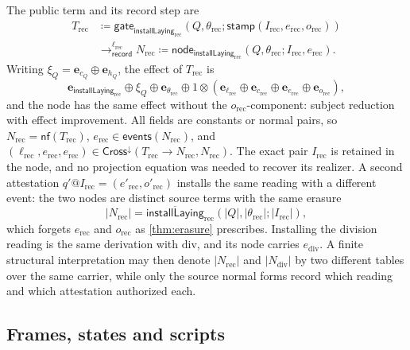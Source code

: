 \documentclass[11pt]{article}
\numberwithin{equation}{section}
\theoremstyle{definition}
\theoremstyle{plain}
\theoremstyle{remark}
\newcommand{\events}{\mathsf{events}}
\newcommand{\nf}{\mathsf{nf}}
\newcommand{\unit}{\mathbf e}
\newcommand{\cross}{\mathsf{Cross}}
\begin{document}
The public term and its record step are
\begin{align*}
 T_{\mathrm{rec}}&\coloneqq
 \mathsf{gate}_{\mathsf{installLaying}_{\mathrm{rec}}}
  (Q,\theta_{\mathrm{rec}};
   \mathsf{stamp}(I_{\mathrm{rec}},e_{\mathrm{rec}},o_{\mathrm{rec}}))\\
 &\longrightarrow_{\mathsf{record}}^{\ell_{\mathrm{rec}}}
 N_{\mathrm{rec}}\coloneqq
 \mathsf{node}_{\mathsf{installLaying}_{\mathrm{rec}}}
  (Q,\theta_{\mathrm{rec}};I_{\mathrm{rec}},e_{\mathrm{rec}}).
\end{align*}
Writing \(\xi_Q=\unit_{c_Q}\oplus\unit_{h_Q}\), the effect of
\(T_{\mathrm{rec}}\) is
\[
 \unit_{\mathsf{installLaying}_{\mathrm{rec}}}\oplus\xi_Q\oplus
 \unit_{\theta_{\mathrm{rec}}}\oplus
 1\otimes(\unit_{\ell_{\mathrm{rec}}}\oplus\unit_{c_{\mathrm{rec}}}
 \oplus\unit_{e_{\mathrm{rec}}}\oplus\unit_{o_{\mathrm{rec}}}),
\]
and the node has the same effect without the \(o_{\mathrm{rec}}\)-component:
subject reduction with effect improvement.  All fields are constants or
normal pairs, so \(N_{\mathrm{rec}}=\nf(T_{\mathrm{rec}})\),
\(e_{\mathrm{rec}}\in\events(N_{\mathrm{rec}})\), and
\((\ell_{\mathrm{rec}},e_{\mathrm{rec}},e_{\mathrm{rec}})
 \in\cross^\downarrow(T_{\mathrm{rec}}\longrightarrow N_{\mathrm{rec}},
 N_{\mathrm{rec}})\).
The exact pair \(I_{\mathrm{rec}}\) is retained in the node, and no
projection equation was needed to recover its realizer.  A second
attestation \(q'@I_{\mathrm{rec}}=(e'_{\mathrm{rec}},o'_{\mathrm{rec}})\)
installs the same reading with a different event: the two nodes are
distinct source terms with the same erasure
\[
 |N_{\mathrm{rec}}|=
 \overline{\mathsf{installLaying}}_{\mathrm{rec}}
 (|Q|,|\theta_{\mathrm{rec}}|;|I_{\mathrm{rec}}|),
\]
which forgets \(e_{\mathrm{rec}}\) and \(o_{\mathrm{rec}}\) as
\cref{thm:erasure} prescribes.  Installing the division reading is the same
derivation with \(\mathrm{div}\), and its node carries \(e_{\mathrm{div}}\).
A finite structural interpretation may then denote \(|N_{\mathrm{rec}}|\)
and \(|N_{\mathrm{div}}|\) by two different tables over the same carrier,
while only the source normal forms record which reading and which
attestation authorized each.

\subsection{Frames, states and scripts}\label{sec:frames-calculus}
\end{document}
